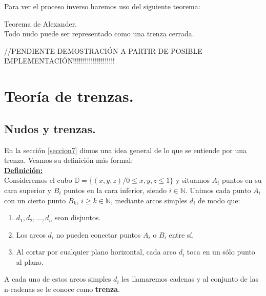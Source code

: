 \documentclass[14pt]{extarticle}
\begin{document}
Para ver el proceso inverso haremos uso del siguiente teorema:
\begin{teo}Teorema de Alexander.\\
	Todo nudo puede ser representado como una trenza cerrada.
\end{teo}
//PENDIENTE DEMOSTRACIÓN A PARTIR DE POSIBLE IMPLEMENTACIÓN!!!!!!!!!!!!!!!!!!!!!


\newpage
\section{Teoría de trenzas. }\label{SegundoTema}
\subsection{Nudos y trenzas.}\label{t2sec1}
En la sección \ref{seccion7} dimos una idea general de lo que se entiende por una trenza. Veamos su definición más formal:\\

\underline{\textbf{Definición:}}\\
Consideremos el cubo $\mathds{D} = \{(x,y,z) / 0 \leq x,y,z \leq 1\}$ y situamos $A_{i}$ puntos en su cara superior y $B_{i}$ puntos en la cara inferior, siendo $i \in \mathds{N}$. Unimos cada punto $A_{i}$ con un cierto punto $B_{k}$, $i \geq k \in \mathds{N}$, mediante arcos simples $d_{i}$ de modo que:
\begin{enumerate}
	\item $ d_{1}, d_{2},...,d_{n} $ sean disjuntos.
	\item Los arcos $ d_{i} $ no pueden conectar puntos $A_{i}$ o $B_{i}$ entre sí.
	\item Al cortar por cualquier plano horizontal, cada arco $ d_{i} $ toca en un sólo punto al plano. 
\end{enumerate}
A cada uno de estos arcos simples $ d_{i} $ les llamaremos cadenas y al conjunto de las n-cadenas se le conoce como \textbf{trenza}.\\
\end{document}
